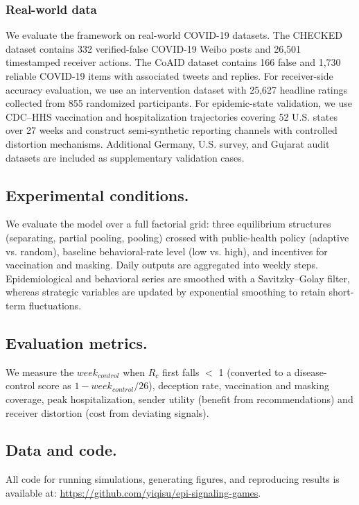 \documentclass[sigconf,review]{acmart}
\begin{document}
\subsubsection{Real-world data}
We evaluate the framework on real-world COVID-19 datasets.
The CHECKED dataset contains 332 verified-false COVID-19 Weibo posts and
26,501 timestamped receiver actions. The CoAID dataset contains 166 false
and 1,730 reliable COVID-19 items with associated tweets and replies. For
receiver-side accuracy evaluation, we use an intervention dataset with
25,627 headline ratings collected from 855 randomized participants.
For epidemic-state validation, we use CDC--HHS vaccination and
hospitalization trajectories covering 52 U.S. states over 27 weeks and
construct semi-synthetic reporting channels with controlled distortion
mechanisms. Additional Germany, U.S. survey, and Gujarat audit datasets
are included as supplementary validation cases.

\subsection{Experimental conditions.}
We evaluate the model over a full factorial grid: three equilibrium structures (separating, partial pooling, pooling) crossed with public-health policy (adaptive vs. random), baseline behavioral-rate level (low vs. high), and incentives for vaccination and masking.
Daily outputs are aggregated into weekly steps. Epidemiological and behavioral series are smoothed with a Savitzky–Golay filter, whereas strategic variables are updated by exponential smoothing to retain short-term fluctuations.

\subsection{Evaluation metrics.} We measure the $week_{control}$  when $R_c$ first falls $<$ 1 (converted to a disease-control score as $1-week_{control}/26$), deception rate, vaccination and masking coverage, peak hospitalization, sender utility (benefit from recommendations) and receiver distortion (cost from deviating signals). 

\subsection{Data and code.}
All code for running simulations, generating figures, and reproducing results is available at: \url{https://github.com/yiqisu/epi-signaling-games}.
\end{document}
